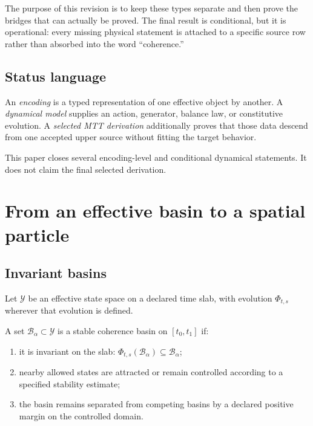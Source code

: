 \documentclass[11pt]{article}
\newcommand{\cY}{\mathcal{Y}}
\newcommand{\cB}{\mathcal{B}}
\begin{document}
The purpose of this revision is to keep these types separate and then prove the
bridges that can actually be proved.  The final result is conditional, but it
is operational: every missing physical statement is attached to a specific
source row rather than absorbed into the word ``coherence.''

\subsection{Status language}

\begin{definition}\label{def:status}
An \emph{encoding} is a typed representation of one effective object by
another.  A \emph{dynamical model} supplies an action, generator, balance law,
or constitutive evolution.  A \emph{selected MTT derivation} additionally
proves that those data descend from one accepted upper source without fitting
the target behavior.
\end{definition}

This paper closes several encoding-level and conditional dynamical statements.
It does not claim the final selected derivation.

\section{From an effective basin to a spatial particle}

\subsection{Invariant basins}

Let $\cY$ be an effective state space on a declared time slab, with evolution
$\Phi_{t,s}$ wherever that evolution is defined.

\begin{definition}\label{def:basin}
A set $\cB_\alpha\subset\cY$ is a stable coherence basin on $[t_0,t_1]$ if:
\begin{enumerate}
\item it is invariant on the slab:
$\Phi_{t,s}(\cB_\alpha)\subseteq\cB_\alpha$;
\item nearby allowed states are attracted or remain controlled according to a
specified stability estimate;
\item the basin remains separated from competing basins by a declared
positive margin on the controlled domain.
\end{enumerate}
\end{definition}
\end{document}
